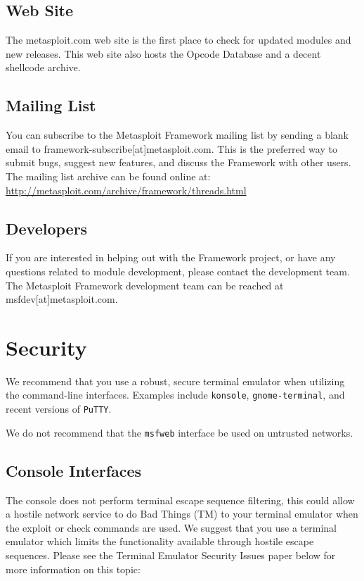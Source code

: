 \documentclass{report}
\begin{document}
\section{Web Site}
\par
The metasploit.com web site is the first place to check for updated modules and
new releases. This web site also hosts the Opcode Database and a decent shellcode
archive.  

\section{Mailing List}
\par
You can subscribe to the Metasploit Framework mailing list by sending a blank
email to framework-subscribe[at]metasploit.com. This is the preferred way to
submit bugs, suggest new features, and discuss the Framework with other users.
The mailing list archive can be found online at:
\url{http://metasploit.com/archive/framework/threads.html}

\section{Developers}
\par
If you are interested in helping out with the Framework project, or have any
questions related to module development, please contact the development team. The
Metasploit Framework development team can be reached at msfdev[at]metasploit.com.

\pagebreak
\appendix

\pagebreak
\chapter{Security}

\par
We recommend that you use a robust, secure terminal emulator when
utilizing the command-line interfaces. Examples include \texttt{konsole},
\texttt{gnome-terminal}, and recent versions of \texttt{PuTTY}.

\par
We do not recommend that the \texttt{msfweb} interface be used on untrusted
networks. 

	\section{Console Interfaces}
\par
The console does not perform terminal escape sequence filtering, this
could allow a hostile network service to do Bad Things (TM) to your terminal
emulator when the exploit or check commands are used. We suggest that you
use a terminal emulator which limits the functionality available through
hostile escape sequences. Please see the Terminal Emulator Security Issues paper
below for more information on this topic:
\end{document}

